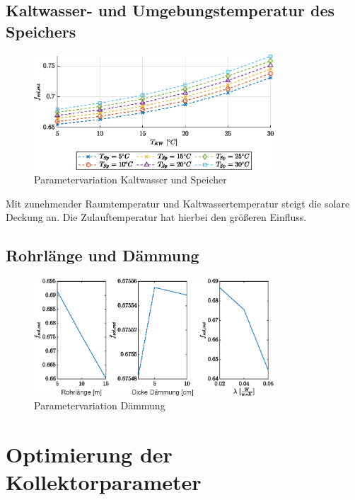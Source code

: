 \subsection{Kaltwasser- und Umgebungstemperatur des Speichers}
\begin{figure}[H]
	\centering
	\includegraphics[width=0.8\textwidth]{../DATA/Aufgabe2.2.eps}
	\caption[Parametervariation Kaltwasser und Speicher]{Parametervariation Kaltwasser und Speicher}
	\label{fig:par1}
\end{figure}


Mit zunehmender Raumtemperatur und Kaltwassertemperatur steigt die solare Deckung an. Die Zulauftemperatur hat hierbei den größeren Einfluss.

\subsection{Rohrlänge und Dämmung}

\begin{figure}[H]
	\centering
	\includegraphics[width=0.8\textwidth]{../DATA/Aufgabe2.3.eps}
	\caption[Parametervariation Dämmung]{Parametervariation Dämmung}
	\label{fig:par2}
\end{figure}

\section{Optimierung der Kollektorparameter}

